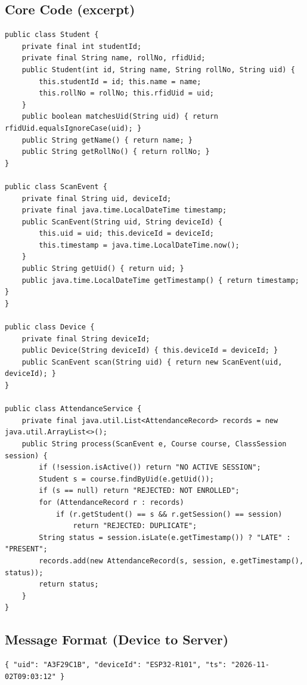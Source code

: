\documentclass[11pt,a4paper]{article}
\begin{document}
\subsection{Core Code (excerpt)}
\begin{lstlisting}[style=java,caption={Key classes of the prototype (simplified).}]
public class Student {
    private final int studentId;
    private final String name, rollNo, rfidUid;
    public Student(int id, String name, String rollNo, String uid) {
        this.studentId = id; this.name = name;
        this.rollNo = rollNo; this.rfidUid = uid;
    }
    public boolean matchesUid(String uid) { return rfidUid.equalsIgnoreCase(uid); }
    public String getName() { return name; }
    public String getRollNo() { return rollNo; }
}
 
public class ScanEvent {
    private final String uid, deviceId;
    private final java.time.LocalDateTime timestamp;
    public ScanEvent(String uid, String deviceId) {
        this.uid = uid; this.deviceId = deviceId;
        this.timestamp = java.time.LocalDateTime.now();
    }
    public String getUid() { return uid; }
    public java.time.LocalDateTime getTimestamp() { return timestamp; }
}
 
public class Device {
    private final String deviceId;
    public Device(String deviceId) { this.deviceId = deviceId; }
    public ScanEvent scan(String uid) { return new ScanEvent(uid, deviceId); }
}
 
public class AttendanceService {
    private final java.util.List<AttendanceRecord> records = new java.util.ArrayList<>();
    public String process(ScanEvent e, Course course, ClassSession session) {
        if (!session.isActive()) return "NO ACTIVE SESSION";
        Student s = course.findByUid(e.getUid());
        if (s == null) return "REJECTED: NOT ENROLLED";
        for (AttendanceRecord r : records)
            if (r.getStudent() == s && r.getSession() == session)
                return "REJECTED: DUPLICATE";
        String status = session.isLate(e.getTimestamp()) ? "LATE" : "PRESENT";
        records.add(new AttendanceRecord(s, session, e.getTimestamp(), status));
        return status;
    }
}
\end{lstlisting}
 
\subsection{Message Format (Device to Server)}
\begin{lstlisting}[basicstyle=\ttfamily\footnotesize,frame=single,caption={MQTT payload on topic attendance/scan.}]
{ "uid": "A3F29C1B", "deviceId": "ESP32-R101", "ts": "2026-11-02T09:03:12" }
\end{lstlisting}
 
\end{document}
